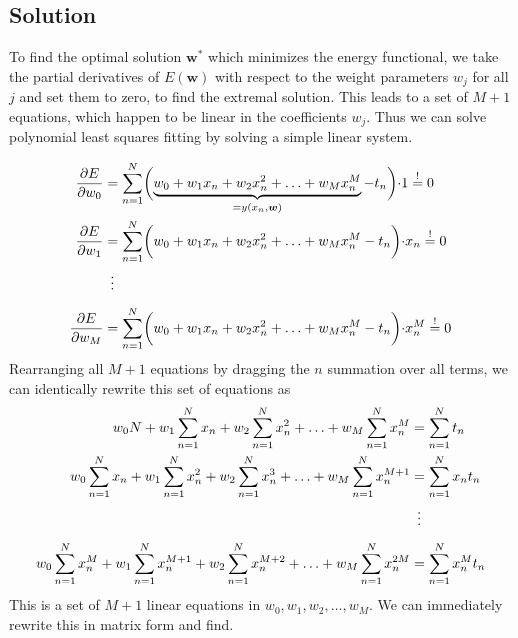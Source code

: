 \documentclass[11pt, DINA4, fleqn]{amsart}
\def\vw{\boldsymbol{w}\xspace}
\begin{document}
\subsection*{Solution}
To find the optimal solution $\vw^*$ which minimizes the energy functional, we take the partial derivatives of $E(\vw)$ with respect to the weight parameters $w_j$ for all $j$ and set them to zero, to find the extremal solution. This leads to a set of $M+1$ equations, which happen to be linear in the coefficients $w_j$. Thus we can solve polynomial least squares fitting by solving a simple linear system.

\begin{align}
\dfrac{\partial E}{\partial w_0} &= \sum \displaylimits_{n = 1}^{N}
\biggl(\underbrace{w_0 + w_1 x_n + w_2 x_n^2 + \dotsc + w_M x_n^M}_{=y(x_n,\vw)} - t_n\biggl) \cdot 1
\overset{!}{=} 0 \\
\dfrac{\partial E}{\partial w_1} &= \sum \displaylimits_{n = 1}^{N}
\biggl(w_0 + w_1 x_n + w_2 x_n^2 + \dotsc + w_M x_n^M - t_n\biggl) \cdot x_n
\overset{!}{=} 0 \\
\phantom{\dfrac{\partial E}{\partial w_M}}&\,\,\,\vdots \\
\dfrac{\partial E}{\partial w_M} &= \sum \displaylimits_{n = 1}^{N}
\biggl(w_0 + w_1 x_n + w_2 x_n^2 + \dotsc + w_M x_n^M - t_n\biggl) \cdot x_n^M
\overset{!}{=} 0
\end{align}
Rearranging all $M+1$ equations by dragging the $n$ summation over all terms, we can identically rewrite this set of equations as
\begin{align}
w_0 N + w_1 \sum\displaylimits_{n = 1}^{N}x_n
+ w_2 \sum\displaylimits_{n = 1}^{N}x_n^2 + \dotsc + w_M \sum\displaylimits_{n = 1}^{N}x_n^M  &= \sum\displaylimits_{n = 1}^{N} t_n \\
w_0 \sum\displaylimits_{n = 1}^{N} x_n + w_1 \sum\displaylimits_{n = 1}^{N}x_n^2
+ w_2 \sum\displaylimits_{n = 1}^{N}x_n^3 + \dotsc + w_M \sum\displaylimits_{n = 1}^{N}x_n^{M + 1}  &= \sum\displaylimits_{n = 1}^{N} x_n t_n
 \\
\phantom{\dfrac{\partial E}{\partial w_M}}&\,\,\,\vdots \\
w_0 \sum\displaylimits_{n = 1}^{N} x_n^M + w_1 \sum\displaylimits_{n = 1}^{N}x_n^{M+1}
+ w_2 \sum\displaylimits_{n = 1}^{N}x_n^{M+2} + \dotsc + w_M \sum\displaylimits_{n = 1}^{N}x_n^{2M}  &= \sum\displaylimits_{n = 1}^{N} x_n^M t_n
\end{align}
This is a set of $M+1$ linear equations in $w_0, w_1, w_2, \dotsc, w_M$. We can immediately rewrite this in matrix form and find.
\end{document}
